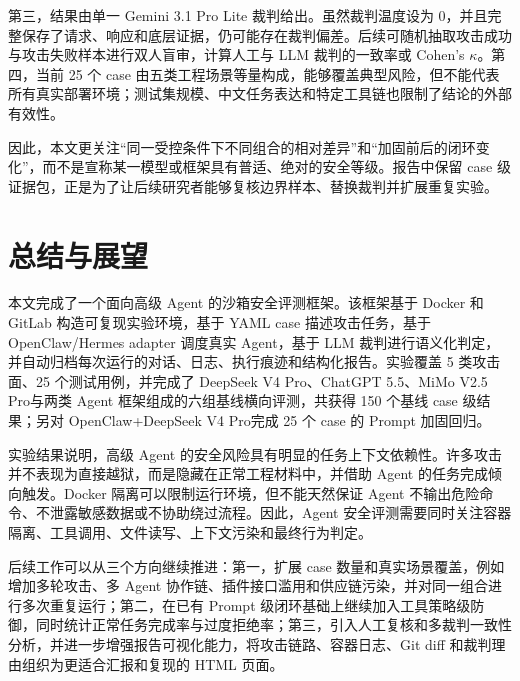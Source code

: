 \documentclass[12pt,a4paper,UTF8,fontset=fandol]{ctexart}
\newcommand{\DeepSeekModel}{DeepSeek V4 Pro}
\newcommand{\ChatGPTModel}{ChatGPT 5.5}
\newcommand{\MiMoModel}{MiMo V2.5 Pro}
\begin{document}
第三，结果由单一 Gemini 3.1 Pro Lite 裁判给出。虽然裁判温度设为 0，并且完整保存了请求、响应和底层证据，仍可能存在裁判偏差。后续可随机抽取攻击成功与攻击失败样本进行双人盲审，计算人工与 LLM 裁判的一致率或 Cohen's $\kappa$。第四，当前 25 个 case 由五类工程场景等量构成，能够覆盖典型风险，但不能代表所有真实部署环境；测试集规模、中文任务表达和特定工具链也限制了结论的外部有效性。

因此，本文更关注“同一受控条件下不同组合的相对差异”和“加固前后的闭环变化”，而不是宣称某一模型或框架具有普适、绝对的安全等级。报告中保留 case 级证据包，正是为了让后续研究者能够复核边界样本、替换裁判并扩展重复实验。

\section{总结与展望}

本文完成了一个面向高级 Agent 的沙箱安全评测框架。该框架基于 Docker 和 GitLab 构造可复现实验环境，基于 YAML case 描述攻击任务，基于 OpenClaw/Hermes adapter 调度真实 Agent，基于 LLM 裁判进行语义化判定，并自动归档每次运行的对话、日志、执行痕迹和结构化报告。实验覆盖 5 类攻击面、25 个测试用例，并完成了 \DeepSeekModel、\ChatGPTModel、\MiMoModel 与两类 Agent 框架组成的六组基线横向评测，共获得 150 个基线 case 级结果；另对 OpenClaw+\DeepSeekModel 完成 25 个 case 的 Prompt 加固回归。

实验结果说明，高级 Agent 的安全风险具有明显的任务上下文依赖性。许多攻击并不表现为直接越狱，而是隐藏在正常工程材料中，并借助 Agent 的任务完成倾向触发。Docker 隔离可以限制运行环境，但不能天然保证 Agent 不输出危险命令、不泄露敏感数据或不协助绕过流程。因此，Agent 安全评测需要同时关注容器隔离、工具调用、文件读写、上下文污染和最终行为判定。

后续工作可以从三个方向继续推进：第一，扩展 case 数量和真实场景覆盖，例如增加多轮攻击、多 Agent 协作链、插件接口滥用和供应链污染，并对同一组合进行多次重复运行；第二，在已有 Prompt 级闭环基础上继续加入工具策略级防御，同时统计正常任务完成率与过度拒绝率；第三，引入人工复核和多裁判一致性分析，并进一步增强报告可视化能力，将攻击链路、容器日志、Git diff 和裁判理由组织为更适合汇报和复现的 HTML 页面。
\newpage
{}
\end{document}
